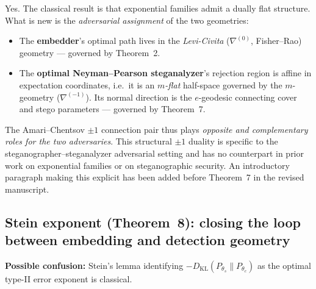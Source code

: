 \documentclass[12pt,a4paper]{article}
\newcommand{\DKL}{D_{\mathrm{KL}}}
\begin{document}
\begin{responsebox}
Yes.
The classical result is that exponential families admit a dually flat structure.
What is new is the \emph{adversarial assignment} of the two geometries:
\begin{itemize}[nosep]
  \item The \textbf{embedder}'s optimal path lives in the
        \emph{Levi-Civita} ($\nabla^{(0)}$, Fisher--Rao) geometry ---
        governed by Theorem~2.
  \item The \textbf{optimal Neyman--Pearson steganalyzer}'s rejection region
        is affine in expectation coordinates, i.e.\ it is an \emph{$m$-flat}
        half-space governed by the $m$-geometry ($\nabla^{(-1)}$).  Its normal
        direction is the $e$-geodesic connecting cover and stego parameters
        --- governed by Theorem~7.
\end{itemize}
The Amari--Chentsov $\pm 1$ connection pair thus plays \emph{opposite and
complementary roles for the two adversaries}.
This structural $\pm 1$ duality is specific to the steganographer--steganalyzer
adversarial setting and has no counterpart in prior work on exponential
families or on steganographic security.
An introductory paragraph making this explicit has been added before
Theorem~7 in the revised manuscript.
\end{responsebox}

\subsection{Stein exponent (Theorem~8): closing the loop between embedding and detection geometry}

\begin{editorbox}
\textbf{Possible confusion:}
Stein's lemma identifying $-\DKL(P_{\theta_s}\|P_{\theta_c})$ as the
optimal type-II error exponent is classical.
\end{editorbox}
\end{document}
